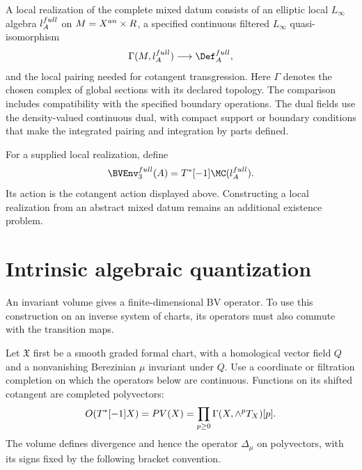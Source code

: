 \begin{definition}
A local realization of the complete mixed datum consists of an elliptic local $L_\infty$ algebra $l_{A}^{full}$ on $M=X^{an}\times R$, a specified continuous filtered $L_\infty$ quasi-isomorphism
\[
 \Gamma(M,\flie_{\mathbb A}^{\mathrm{full}})
 \longrightarrow \Def_{\mathbb A}^{\mathrm{full}},
\]
and the local pairing needed for cotangent transgression. Here $\Gamma$ denotes the chosen complex of global sections with its declared topology. The comparison includes compatibility with the specified boundary operations. The dual fields use the density-valued continuous dual, with compact support or boundary conditions that make the integrated pairing and integration by parts defined.

For a supplied local realization, define
\[
 \BVEnv_3^{\mathrm{full}}(\mathbb A)
 =T^*[-1]\MC(\flie_{\mathbb A}^{\mathrm{full}}).
\]
Its action is the cotangent action displayed above. Constructing a local realization from an abstract mixed datum remains an additional existence problem.
\end{definition}

\section{Intrinsic algebraic quantization}
An invariant volume gives a finite-dimensional BV operator. To use this
construction on an inverse system of charts, its operators must also commute
with the transition maps.

Let $\mathfrak X$ first be a smooth graded formal chart, with a homological
vector field $Q$ and a nonvanishing Berezinian $\mu$ invariant under $Q$.
Use a coordinate or filtration completion on which the operators below are
continuous. Functions on its shifted cotangent are completed polyvectors:
\[
 O(T^*[-1]X)=PV(X)
 =\prod_{p\geq0}\Gamma(X,\wedge^pT_{X})[p].
\]
The volume defines divergence and hence the operator $\Delta_\mu$ on
polyvectors, with its signs fixed by the following bracket convention.

